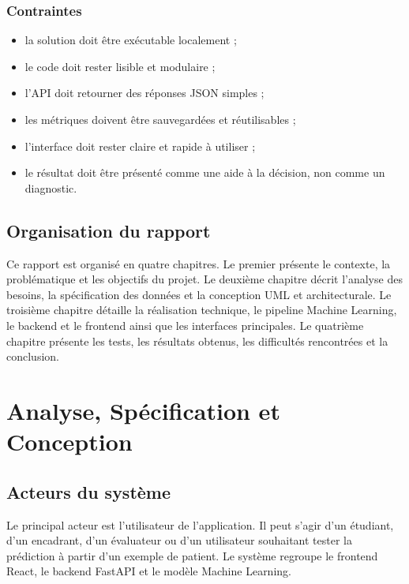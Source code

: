 \documentclass[12pt,a4paper]{report}
\begin{document}
\subsection{Contraintes}
\begin{itemize}[label=--]
  \item la solution doit être exécutable localement ;
  \item le code doit rester lisible et modulaire ;
  \item l'API doit retourner des réponses JSON simples ;
  \item les métriques doivent être sauvegardées et réutilisables ;
  \item l'interface doit rester claire et rapide à utiliser ;
  \item le résultat doit être présenté comme une aide à la décision, non comme un diagnostic.
\end{itemize}

\section{Organisation du rapport}
Ce rapport est organisé en quatre chapitres. Le premier présente le contexte, la problématique et les objectifs du projet. Le deuxième chapitre décrit l'analyse des besoins, la spécification des données et la conception UML et architecturale. Le troisième chapitre détaille la réalisation technique, le pipeline Machine Learning, le backend et le frontend ainsi que les interfaces principales. Le quatrième chapitre présente les tests, les résultats obtenus, les difficultés rencontrées et la conclusion.

\chapter{Analyse, Spécification et Conception}

\section{Acteurs du système}
Le principal acteur est l'utilisateur de l'application. Il peut s'agir d'un étudiant, d'un encadrant, d'un évaluateur ou d'un utilisateur souhaitant tester la prédiction à partir d'un exemple de patient. Le système regroupe le frontend React, le backend FastAPI et le modèle Machine Learning.
\end{document}
